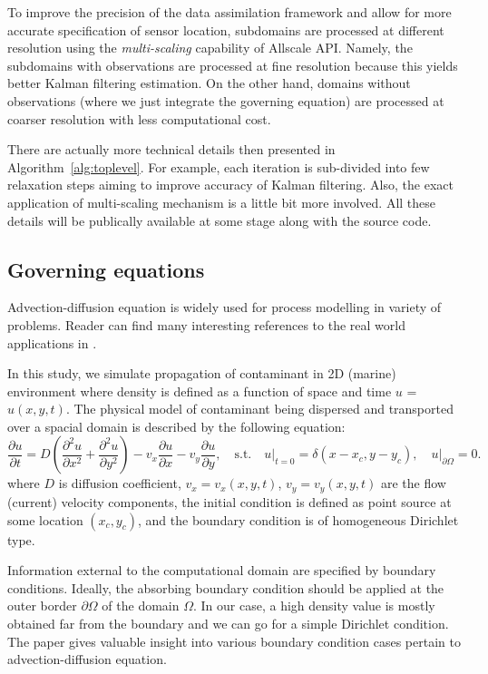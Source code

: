 \documentclass[acmsmall,review,anonymous]{acmart}\settopmatter{printfolios=true,printccs=false,printacmref=false}
\begin{document}
To improve the precision of the data assimilation framework and allow for more accurate specification of sensor location, subdomains are processed at different resolution using the \textit{multi-scaling} capability of Allscale API. Namely, the subdomains with observations are processed at fine resolution because this yields better Kalman filtering estimation. On the other hand, domains without observations (where we just integrate the governing equation) are processed at coarser resolution with less computational cost. 

There are actually more technical details then presented in Algorithm~\ref{alg:toplevel}. For example, each iteration is sub-divided into few relaxation steps aiming to improve accuracy of Kalman filtering. Also, the exact application of multi-scaling mechanism is a little bit more involved. All these details will be publically available at some stage along with the source code. 

\subsection{Governing equations}

Advection-diffusion equation is widely used for process modelling in variety of problems. Reader can find many interesting references to the real world applications in \cite{Miyaoka17}.

In this study, we simulate propagation of contaminant in 2D (marine) environment where density is defined as a function of space and time $u$ = $u(x,y,t)$. The physical model of contaminant being dispersed and transported over a spacial domain is described by the following equation:
\begin{equation}
\frac{\partial u}{\partial t} =
D \left(\frac{\partial^2 u}{\partial x^2} + \frac{\partial^2 u}{\partial y^2}\right)
- v_x \frac{\partial u}{\partial x}
- v_y \frac{\partial u}{\partial y},
\,\,\,\,\,\,\mbox{s.t.}\,\,\,\,\,\,
u\rvert_{t=0} = \delta(x\!-\!x_c,y\!-\!y_c),
\,\,\,\,\,\,u\rvert_{\partial\Omega}=0.
\label{eq:pde}
\end{equation}
where $D$ is diffusion coefficient, $v_x = v_x(x,y,t)$, $v_y = v_y(x,y,t)$ are the flow (current) velocity components, the initial condition is defined as point source at some location $(x_c,y_c)$, and the boundary condition is of homogeneous Dirichlet type.

Information external to the computational domain are specified by boundary conditions. Ideally, the absorbing boundary condition should be applied at the outer border $\partial\Omega$ of the domain $\Omega$. In our case, a high density value is mostly obtained far from the boundary and we can go for a simple Dirichlet condition. The paper \cite{Miyaoka17} gives valuable insight into various boundary condition cases pertain to advection-diffusion equation.
\end{document}
